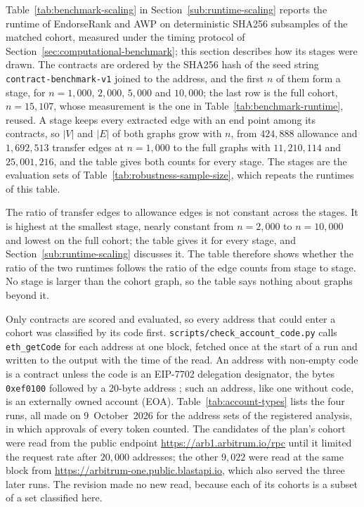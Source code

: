 Table~\ref{tab:benchmark-scaling} in Section~\ref{sub:runtime-scaling} reports the runtime of EndorseRank and AWP on deterministic SHA256 subsamples of the matched cohort, measured under the timing protocol of Section~\ref{sec:computational-benchmark}; this section describes how its stages were drawn. The contracts are ordered by the SHA256 hash of the seed string \texttt{contract-benchmark-v1} joined to the address, and the first $n$ of them form a stage, for $n=1{,}000$, $2{,}000$, $5{,}000$ and $10{,}000$; the last row is the full cohort, $n=15{,}107$, whose measurement is the one in Table~\ref{tab:benchmark-runtime}, reused. A stage keeps every extracted edge with an end point among its contracts, so $|V|$ and $|E|$ of both graphs grow with $n$, from $424{,}888$ allowance and $1{,}692{,}513$ transfer edges at $n=1{,}000$ to the full graphs with $11{,}210{,}114$ and $25{,}001{,}216$, and the table gives both counts for every stage. The stages are the evaluation sets of Table~\ref{tab:robustness-sample-size}, which repeats the runtimes of this table.

The ratio of transfer edges to allowance edges is not constant across the stages. It is highest at the smallest stage, nearly constant from $n=2{,}000$ to $n=10{,}000$ and lowest on the full cohort; the table gives it for every stage, and Section~\ref{sub:runtime-scaling} discusses it. The table therefore shows whether the ratio of the two runtimes follows the ratio of the edge counts from stage to stage. No stage is larger than the cohort graph, so the table says nothing about graphs beyond it.


Only contracts are scored and evaluated, so every address that could enter a cohort was classified by its code first. \texttt{scripts/check\_account\_code.py} calls \texttt{eth\_getCode} for each address at one block, fetched once at the start of a run and written to the output with the time of the read. An address with non-empty code is a contract unless the code is an EIP-7702 delegation designator, the bytes \texttt{0xef0100} followed by a 20-byte address \parencite{buterin2024eip7702}; such an address, like one without code, is an externally owned account (EOA). Table~\ref{tab:account-types} lists the four runs, all made on 9~October~2026 for the address sets of the registered analysis, in which approvals of every token counted. The candidates of the plan's cohort were read from the public endpoint \url{https://arb1.arbitrum.io/rpc} until it limited the request rate after $20{,}000$ addresses; the other $9{,}022$ were read at the same block from \url{https://arbitrum-one.public.blastapi.io}, which also served the three later runs. The revision made no new read, because each of its cohorts is a subset of a set classified here.

